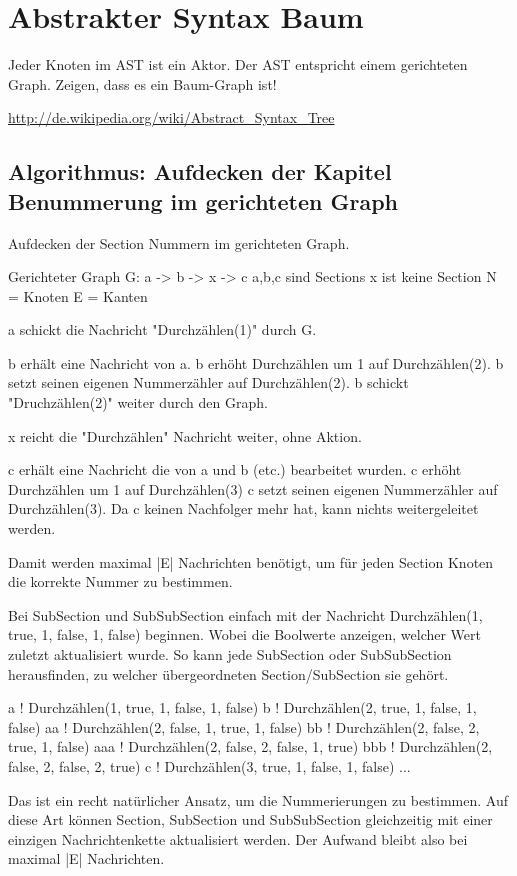 \section{Abstrakter Syntax Baum}

Jeder Knoten im AST ist ein Aktor. Der AST entspricht einem gerichteten Graph.
Zeigen, dass es ein Baum-Graph ist!

\url{http://de.wikipedia.org/wiki/Abstract_Syntax_Tree}


\subsection{Algorithmus: Aufdecken der Kapitel Benummerung im gerichteten Graph}

Aufdecken der Section Nummern im gerichteten Graph.

Gerichteter Graph G: a -> b -> x -> c
a,b,c sind Sections
x ist keine Section
N = Knoten
E = Kanten

a schickt die Nachricht "Durchzählen(1)" durch G.

b erhält eine Nachricht von a.
b erhöht Durchzählen um 1 auf Durchzählen(2).
b setzt seinen eigenen Nummerzähler auf Durchzählen(2).
b schickt "Druchzählen(2)" weiter durch den Graph.

x reicht die "Durchzählen" Nachricht weiter, ohne Aktion.

c erhält eine Nachricht die von a und b (etc.) bearbeitet wurden.
c erhöht Durchzählen um 1 auf Durchzählen(3)
c setzt seinen eigenen Nummerzähler auf Durchzählen(3).
Da c keinen Nachfolger mehr hat, kann nichts weitergeleitet werden.

Damit werden maximal |E| Nachrichten benötigt, um für jeden Section Knoten
die korrekte Nummer zu bestimmen.


Bei SubSection und SubSubSection einfach mit der
Nachricht Durchzählen(1, true, 1, false, 1, false) beginnen.
Wobei die Boolwerte anzeigen, welcher Wert zuletzt aktualisiert wurde.
So kann jede SubSection oder SubSubSection herausfinden, zu welcher
übergeordneten Section/SubSection sie gehört.

a ! Durchzählen(1, true, 1, false, 1, false)
b ! Durchzählen(2, true, 1, false, 1, false)
aa ! Durchzählen(2, false, 1, true, 1, false)
bb ! Durchzählen(2, false, 2, true, 1, false)
aaa ! Durchzählen(2, false, 2, false, 1, true)
bbb ! Durchzählen(2, false, 2, false, 2, true)
c ! Durchzählen(3, true, 1, false, 1, false)
...

Das ist ein recht natürlicher Ansatz, um die Nummerierungen zu bestimmen.
Auf diese Art können Section, SubSection und SubSubSection gleichzeitig
mit einer einzigen Nachrichtenkette aktualisiert werden.
Der Aufwand bleibt also bei maximal |E| Nachrichten.


